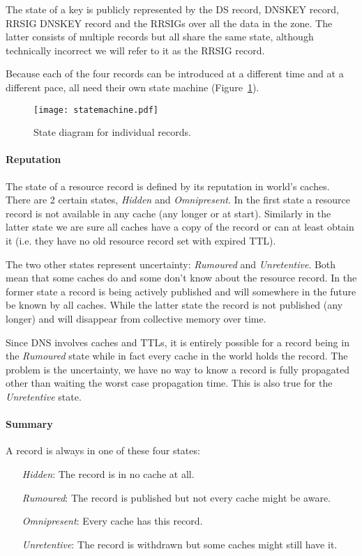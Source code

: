 \documentclass[twoside, a4paper]{article}
\begin{document}
The state of a key is publicly represented by the DS record, DNSKEY 
record, RRSIG DNSKEY record and the RRSIGs over all the data in the 
zone. The latter consists of multiple records but all share the same 
state, although technically incorrect we will refer to it as the 
RRSIG record.

Because each of the four records can be introduced at a different 
time and at a different pace, all need their own state machine 
(Figure~\ref{fig:statemachine}).

\begin{figure}[h]
	\centering
	\texttt{[image: statemachine.pdf]}
	\caption{State diagram for individual records.}
	\label{fig:statemachine}
\end{figure}


\paragraph{Reputation} The state of a resource record is defined by 
its reputation in world's caches. There are 2 certain states, \emph 
{Hidden} and \emph {Omnipresent}. In the first state a resource 
record is not available in any cache (any longer or at start). 
Similarly in the latter state we are sure all caches have a copy of 
the record or can at least obtain it (i.e. they have no old 
resource record set with expired TTL).

The two other states represent uncertainty: \emph{Rumoured} and \emph
{Unretentive}. Both mean that some caches do and some don't know 
about the resource record. In the former state a record is being 
actively published and will somewhere in the future be known by all 
caches. While the latter state the record is not published (any 
longer) and will disappear from collective memory over time.

Since DNS involves caches and TTLs, it is entirely possible for a 
record being in the \emph{Rumoured} state while in fact every cache 
in the world holds the record. The problem is the uncertainty, we 
have no way to know a record is fully propagated other than waiting 
the worst case propagation time. This is also true for the \emph
{Unretentive} state.

\paragraph{Summary} A record is always in one of these four states:

\begin{itemize}
\item[\emph{Hidden}:] 		
			The record is in no cache at all.
\item[\emph{Rumoured}:] 		
			The record is published but not every cache might be aware.
\item[\emph{Omnipresent}:]
			Every cache has this record.
\item[\emph{Unretentive}:]
			The record is withdrawn but some caches might still have it.
\end{itemize} 
\end{document}
